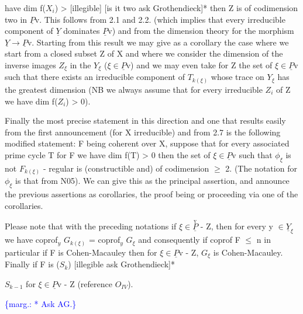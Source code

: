 \documentclass[11pt]{article}
\newcommand{\margin}[1]{\textcolor{blue}{\{\textsf{marg.:} #1\}}}
\begin{document}
have dim f($X_{i}$) > [illegible] [is it two ask Grothendieck]* then Z
is of codimension two in $\underline{P}$v.  This follows from 2.1 and 2.2.
(which implies that every irreducible component of $\underline{Y}$ dominates $\underline{P}$v)
and from the dimension theory for the morphism $\underline{Y} \rightarrow \underline{P}$v.  Starting
from this result we may give as a corollary the case where we
start from a closed subset Z of X and where we consider the
dimension of the inverse images $Z_{\xi}$ in the $Y_{\xi}$ ($\xi \in \underline{P}$v) and we may
even take for Z the set of $\xi \in \underline{P}$v such that there exists an
irreducible component of $T_{k(\xi)}$ whose trace on $Y_{\xi}$ has the greatest
dimension (NB we always assume that for every irreducible $Z_{i}$ of Z
we have dim f($Z_{i}$) > 0).

Finally the most precise statement in this direction and one
that results easily from the first announcement (for X irreducible) and
from 2.7 is the following modified statement:  F being coherent
over X, suppose that for every associated prime cycle T for F we
have dim f(T) > 0 then the set of $\xi \in \underline{P}$v such that $\phi_{\xi}$ is not $F_{k(\xi)}$ -
regular is (constructible and) of codimension $\geq$ 2.  (The notation
for $\phi_{\xi}$ is that from N05).  We can give this as the principal
assertion, and announce the previous assertions as corollaries,
the proof being or proceeding via one of the corollaries.

Please note that with the preceding notations if $\xi \in \overset{\mathrm{v}}{\underline{P}}$ - Z,
then for every y $\in \underline{Y}_{\xi}$ we have coprof$_{y}$ $G_{k(\xi)}$ = coprof$_{y}$ $G_{\xi}$ and
consequently if coprof F $\leq$ n in particular if F is Cohen-Macauley
then for $\xi \in \underline{P}$v - Z, $G_{\xi}$ is Cohen-Macauley.  Finally if F is ($S_{k}$)
[illegible ask Grothendieck]*

$S_{k-1}$ for $\xi \in \underline{P}$v - Z (reference $O_{IV}$).

\margin{* Ask AG.}
\end{document}
